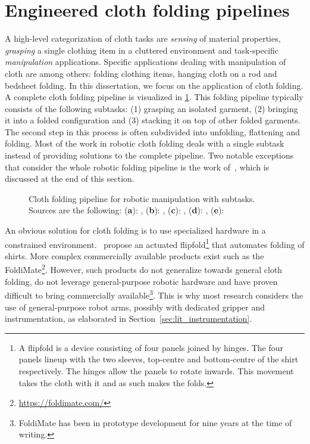 \section{Engineered cloth folding pipelines} \label{sec:lit_cloth_folding_pipelines}
A high-level categorization of cloth tasks are \emph{sensing} of material properties, \emph{grasping} a single clothing item in a cluttered environment and task-specific \emph{manipulation} applications. Specific applications dealing with manipulation of cloth are among others: folding clothing items, hanging cloth on a rod and bedsheet folding. In this dissertation, we focus on the application of cloth folding. A complete cloth folding pipeline is visualized in \cref{fig:complete_folding_pipeline}. This folding pipeline typically consists of the following subtasks: (1) grasping an isolated garment, (2) bringing it into a folded configuration and (3) stacking it on top of other folded garments. The second step in this process is often subdivided into unfolding, flattening and folding. Most of the work in robotic cloth folding deals with a single subtask instead of providing solutions to the complete pipeline. Two notable exceptions that consider the whole robotic folding pipeline is the work of~\textcite{Doumanoglou2016,Maitin2010}, which is discussed at the end of this section.

\begin{figure}[p]
    \centering
    
    \caption[Cloth folding pipeline for robotic manipulation with subtasks.]{Cloth folding pipeline for robotic manipulation with subtasks.
        Sources are the following: (\textbf{a}): \autocite{Ramisa2012},
        (\textbf{b}): \autocite{Cusumano2011},
        (\textbf{c}): \autocite{Doumanoglou2016},
        (\textbf{d}): \autocite{Li2015},
        (\textbf{e}): \autocite{Maitin2010}}
    \label{fig:complete_folding_pipeline}
\end{figure}

An obvious solution for cloth folding is to use specialized hardware in a constrained environment.~\Textcite{Nair2013} propose an actuated flipfold\footnote{A flipfold is a device consisting of four panels joined by hinges. The four panels lineup with the two sleeves, top-centre and bottom-centre of the shirt respectively. The hinges allow the panels to rotate inwards. This movement takes the cloth with it and as such makes the folds.} that automates folding of shirts. More complex commercially available products exist such as the FoldiMate\textregistered\footnote{\url{https://foldimate.com/}}. However, such products do not generalize towards general cloth folding, do not leverage general-purpose robotic hardware and have proven difficult to bring commercially available\footnote{FoldiMate has been in prototype development for nine years at the time of writing.}. This is why most research considers the use of general-purpose robot arms, possibly with dedicated gripper and instrumentation, as elaborated in Section~\ref{sec:lit_instrumentation}.

